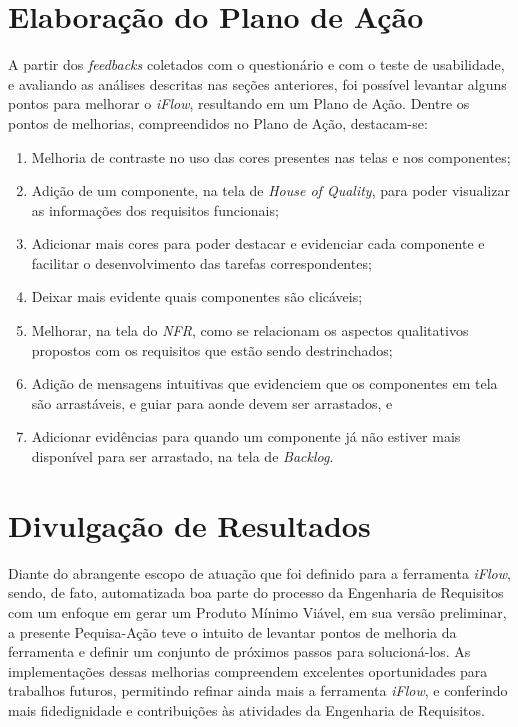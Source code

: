 \section{Elaboração do Plano de Ação}
\label{sec:plano_de_acao}

A partir dos \textit{feedbacks} coletados com o questionário e com o teste de usabilidade, e avaliando as análises descritas nas seções anteriores, foi possível levantar alguns pontos para melhorar o \textit{iFlow}, resultando em um Plano de Ação. Dentre os pontos de melhorias, compreendidos no Plano de Ação, destacam-se:

\begin{enumerate}
    \item Melhoria de contraste no uso das cores presentes nas telas e nos componentes;
    \item Adição de um componente, na tela de \textit{House of Quality}, para poder visualizar as informações dos requisitos funcionais;
    \item Adicionar mais cores para poder destacar e evidenciar cada componente e facilitar o desenvolvimento das tarefas correspondentes;
    \item Deixar mais evidente quais componentes são clicáveis;
    \item Melhorar, na tela do \textit{NFR}, como se relacionam os aspectos qualitativos propostos com os requisitos que estão sendo destrinchados;
    \item Adição de mensagens intuitivas que evidenciem que os componentes em tela são arrastáveis, e guiar para aonde devem ser arrastados, e
    \item Adicionar evidências para quando um componente já não estiver mais disponível para ser arrastado, na tela de \textit{Backlog}.
\end{enumerate}

\section{Divulgação de Resultados}
\label{sec:divulgacao_resultados}
Diante do abrangente escopo de atuação que foi definido para a ferramenta \textit{iFlow}, sendo, de fato, automatizada boa parte do processo da Engenharia de Requisitos com um enfoque em gerar um Produto Mínimo Viável, em sua versão preliminar, a presente Pequisa-Ação teve o intuito de levantar pontos de melhoria da ferramenta e definir um conjunto de próximos passos para solucioná-los. As implementações dessas melhorias compreendem excelentes oportunidades para trabalhos futuros, permitindo refinar ainda mais a ferramenta \textit{iFlow}, e conferindo mais fidedignidade e contribuições às atividades da Engenharia de Requisitos.


